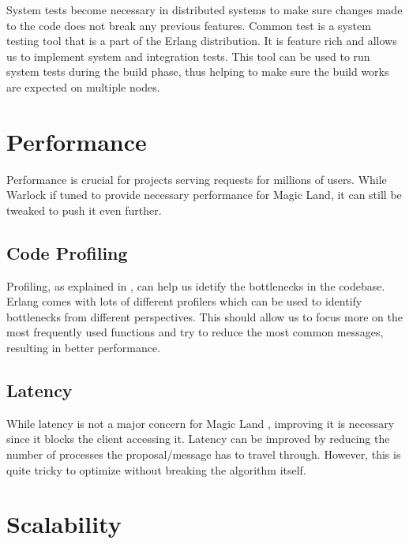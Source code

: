 System tests%
become necessary in distributed systems to make sure changes made to the code
does not break any previous features. Common test \citep{common.test} is a
system testing tool that is a part of the Erlang distribution. It is feature
rich and allows us to implement system and integration tests. This tool can
be used to run system tests during the build phase, thus helping to make sure
the build works are expected on multiple nodes.

\section{Performance}

Performance is crucial for projects serving requests for millions of users.
While Warlock if tuned to provide necessary performance for Magic Land, it
can still be tweaked to push it even further.

\subsection{Code Profiling}

Profiling, as explained in \citep{impl.profiling}, can help us idetify the
bottlenecks in the codebase. Erlang comes with lots of different profilers
which can be used to identify bottlenecks from different perspectives. This
should allow us to focus more on the most frequently used functions and try
to reduce the most common messages, resulting in better performance.

\subsection{Latency}

While latency is not a major concern for Magic Land%
, improving it is necessary since it blocks the client accessing it. Latency
can be improved by reducing the number of processes the proposal/message has
to travel through. However, this is quite tricky to optimize without breaking
the algorithm itself.

\section{Scalability}

